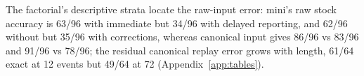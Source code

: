 The factorial's descriptive strata locate the raw-input error: mini's raw stock accuracy is 63/96 with immediate but 34/96 with delayed reporting, and 62/96 without but 35/96 with corrections, whereas canonical input gives 86/96 vs 83/96 and 91/96 vs 78/96; the residual canonical replay error grows with length, 61/64 exact at 12 events but 49/64 at 72 (Appendix~\ref{app:tables}).

